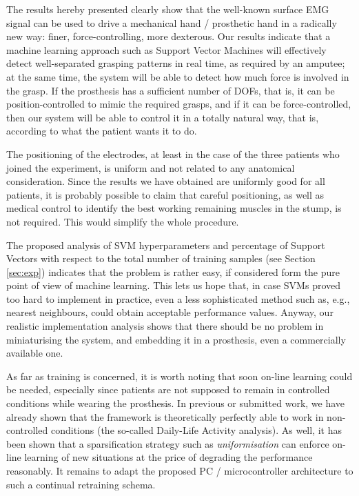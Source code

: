 The results hereby presented clearly show that the well-known surface
EMG signal can be used to drive a mechanical hand / prosthetic hand in
a radically new way: finer, force-controlling, more dexterous. Our
results indicate that a machine learning approach such as Support
Vector Machines will effectively detect well-separated grasping
patterns in real time, as required by an amputee; at the same time,
the system will be able to detect how much force is involved in the
grasp. If the prosthesis has a sufficient number of DOFs, that is, it
can be position-controlled to mimic the required grasps, and if it can
be force-controlled, then our system will be able to control it in a
totally natural way, that is, according to what the patient wants it
to do.

The positioning of the electrodes, at least in the case of the three
patients who joined the experiment, is uniform and not related to any
anatomical consideration. Since the results we have obtained are
uniformly good for all patients, it is probably possible to claim that
careful positioning, as well as medical control to identify the best
working remaining muscles in the stump, is not required. This would
simplify the whole procedure.

The proposed analysis of SVM hyperparameters and percentage of Support
Vectors with respect to the total number of training samples (see
Section \ref{sec:exp}) indicates that the problem is rather easy, if
considered form the pure point of view of machine learning. This lets
us hope that, in case SVMs proved too hard to implement in practice,
even a less sophisticated method such as, e.g., nearest neighbours,
could obtain acceptable performance values. Anyway, our realistic
implementation analysis shows that there should be no problem in
miniaturising the system, and embedding it in a prosthesis, even a
commercially available one.

As far as training is concerned, it is worth noting that soon on-line
learning could be needed, especially since patients are not supposed
to remain in controlled conditions while wearing the prosthesis. In
previous or submitted work, we have already shown that the framework
is theoretically perfectly able to work in non-controlled conditions
(the so-called Daily-Life Activity analysis). As well, it has been
shown that a sparsification strategy such as \emph{uniformisation} can
enforce on-line learning of new situations at the price of degrading
the performance reasonably. It remains to adapt the proposed PC /
microcontroller architecture to such a continual retraining schema.


